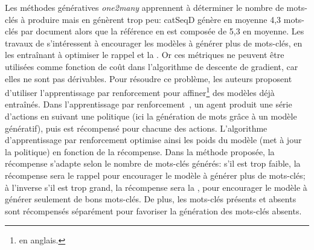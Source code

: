 Les méthodes génératives \emph{one2many} apprennent à déterminer le nombre de mots-clés à produire mais en génèrent trop peu: catSeqD génère en moyenne 4,3 mots-clés par document alors que la référence en est composée de 5,3 en moyenne.
Les travaux de \citet{chan_neural_2019} s'intéressent à encourager les modèles à générer plus de mots-clés, en les entraînant à optimiser le rappel et la \fmesure{}.
Or ces métriques ne peuvent être utilisées comme fonction de coût dans l'algorithme de descente de gradient, car elles ne sont pas dérivables.
Pour résoudre ce problème, les auteurs proposent d'utiliser l'apprentissage par renforcement pour affiner\footnote{ en anglais.} des modèles déjà entraînés.
%
Dans l'apprentissage par renforcement~\cite{williams_simple_1992}, un agent produit une série d'actions en suivant une politique (ici la génération de mots grâce à un modèle génératif), puis est récompensé pour chacune des actions.
L'algorithme d'apprentissage par renforcement optimise ainsi les poids du modèle (met à jour la politique) en fonction de la récompense.
%
Dans la méthode proposée, la récompense s'adapte selon le nombre de mots-clés générés: s'il est trop faible, la récompense sera le rappel pour encourager le modèle à générer plus de mots-clés; à l'inverse s'il est trop grand, la récompense sera la \fmesure{}, pour encourager le modèle à générer seulement de bons mots-clés.
%
De plus, les mots-clés présents et absents sont récompensés séparément pour favoriser la génération des mots-clés absents.


